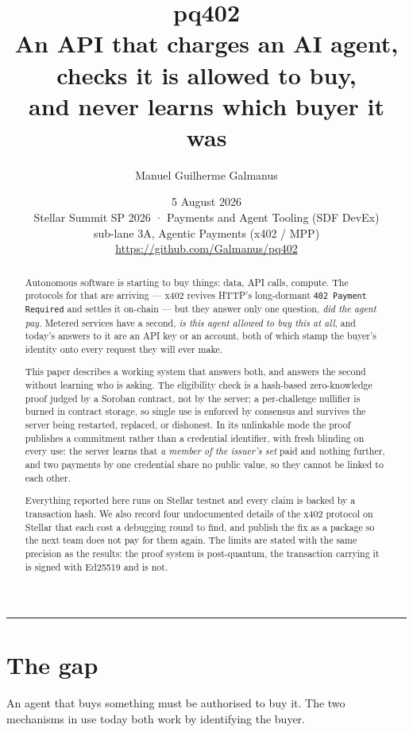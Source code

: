 \documentclass[11pt,a4paper]{article}
\title{\textbf{pq402}\\[0.3em]
\large An API that charges an AI agent, checks it is allowed to buy,\\
and never learns which buyer it was}
\author{Manuel Guilherme Galmanus}
\date{5 August 2026 \\[0.4em]
\small Stellar Summit SP 2026 · Payments and Agent Tooling (SDF DevEx)\\
\small sub-lane 3A, Agentic Payments (x402 / MPP)\\[0.6em]
\small \url{https://github.com/Galmanus/pq402}}
\begin{document}
\maketitle

\begin{abstract}
\noindent
Autonomous software is starting to buy things: data, API calls, compute. The
protocols for that are arriving --- x402 revives HTTP's long-dormant
\texttt{402 Payment Required} and settles it on-chain --- but they answer only
one question, \emph{did the agent pay}. Metered services have a second,
\emph{is this agent allowed to buy this at all}, and today's answers to it are
an API key or an account, both of which stamp the buyer's identity onto every
request they will ever make.

This paper describes a working system that answers both, and answers the second
without learning who is asking. The eligibility check is a hash-based
zero-knowledge proof judged by a Soroban contract, not by the server; a
per-challenge nullifier is burned in contract storage, so single use is
enforced by consensus and survives the server being restarted, replaced, or
dishonest. In its unlinkable mode the proof publishes a commitment rather than
a credential identifier, with fresh blinding on every use: the server learns
that \emph{a member of the issuer's set} paid and nothing further, and two
payments by one credential share no public value, so they cannot be linked to
each other.

Everything reported here runs on Stellar testnet and every claim is backed by a
transaction hash. We also record four undocumented details of the x402 protocol
on Stellar that each cost a debugging round to find, and publish the fix as a
package so the next team does not pay for them again. The limits are stated
with the same precision as the results: the proof system is post-quantum, the
transaction carrying it is signed with Ed25519 and is not.
\end{abstract}

\vspace{0.5em}
\hrule
\vspace{1.2em}

\section{The gap}

An agent that buys something must be authorised to buy it. The two mechanisms
in use today both work by identifying the buyer.
\end{document}
